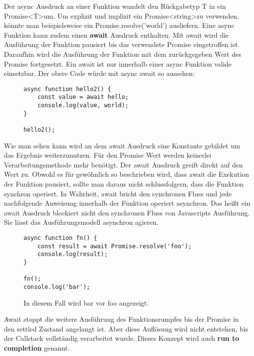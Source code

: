 \noindent
Der async Ausdruck an einer Funktion wandelt den Rückgabetyp T in ein Promise\textless T\textgreater um. Um explizit und implizit ein Promise\textless string\textgreater zu verwenden, könnte man beispielsweise ein Promise.resolve('world') ausliefern. Eine async Funktion kann zudem einen \textbf{await} Ausdruck enthalten. Mit await wird die Ausführung der Funktion pausiert bis das verwendete Promise eingetroffen ist. Daraufhin wird die Ausführung der Funktion mit dem zurückgegeben Wert des Promise fortgesetzt. Ein await ist nur innerhalb einer async Funktion valide einsetzbar. Der obere Code würde mit async await so aussehen:

\begin{figure}[H]
\begin{lstlisting}[basicstyle=\small]
async function hello2() {
    const value = await hello;
    console.log(value, world);
}

hello2();
\end{lstlisting}
\end{figure}

\noindent
Wie man sehen kann wird an dem await Ausdruck eine Konstante gebildet um das Ergebnis weiterzunutzen. Für den Promise Wert werden keinerlei Verarbeitungsmethode mehr benötigt. Der await Ausdruck greift direkt auf den Wert zu. Obwohl es für gewöhnlich so beschrieben wird, dass await die Exekution der Funktion pausiert, sollte man daraus nicht schlussfolgern, dass die Funktion synchron operiert. In Wahrheit, await bricht den synchronen Fluss und jede nachfolgende Anweisung innerhalb der Funktion operiert asynchron. Das heißt ein await Ausdruck blockiert nicht den synchronen Fluss von Javascripts Ausführung. Sie lässt das Ausführungsmodell asynchron agieren.

\begin{figure}[H]
\begin{lstlisting}[basicstyle=\small]
async function fn() {
    const result = await Promise.resolve('foo');
    console.log(result);
}

fn();
console.log('bar');
\end{lstlisting}
\caption{In diesem Fall wird bar vor foo angezeigt.}
\end{figure}

\noindent
Await stoppt die weitere Ausführung des Funktionsrumpfes bis der Promise in den settled Zustand angelangt ist. Aber diese Auflösung wird nicht entstehen, bis der Callstack vollständig verarbeitet wurde. Dieses Konzept wird auch \textbf{run to completion} genannt.\\

